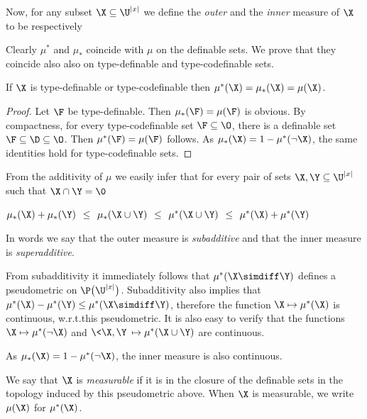 \documentclass[creche.tex]{subfiles}
\begin{document}
Now, for any subset $\X\subseteq\U^{|x|}$ we define the \emph{outer\/} and the \emph{inner\/} measure of $\X$ to be respectively



Clearly $\mu^*$ and $\mu_*$ coincide with $\mu$ on the definable sets.
We prove that they coincide also also on type-definable and type-codefinable sets.

\begin{proposition}
If $\X$ is type-definable or type-codefinable then $\mu^*(\X)=\mu_*(\X)=\mu(\X)$.
\end{proposition}
\begin{proof}
Let $\F$ be type-definable.
Then $\mu_*(\F)=\mu(\F)$ is obvious.
By compactness, for every type-codefinable set $\F\subseteq\O$, there is a definable set $\F\subseteq\D\subseteq\O$.
Then $\mu^*(\F)=\mu(\F)$ follows.
As $\mu_*(\X)=1-\mu^*(\neg\X)$, the same identities hold for type-codefinable sets.
\end{proof}

From the additivity of $\mu$ we easily infer that for every pair of sets $\X,\Y\subseteq\U^{|x|}$ such that $\X\cap\Y=\0$

\ssf{\#}\hfil$\mu_*(\X)+\mu_*(\Y)\medrel{\le}\mu_*(\X\cup\Y)\medrel{\le}\mu^*(\X\cup\Y)\medrel{\le}\mu^*(\X)+\mu^*(\Y)$

In words we say that the outer measure is \emph{subadditive\/} and that the inner measure is \emph{superadditive}.

From subadditivity it immediately follows that $\mu^*(\X\simdiff\Y)$ defines a pseudometric on $\P\big(\U^{|x|}\big)$.
Subadditivity also implies that $\mu^*(\X)-\mu^*(\Y)\le\mu^*(\X\simdiff\Y)$, therefore the function $\X\mapsto\mu^*(\X)$ is continuous, w.r.t.\@ this pseudometric.
It is also easy to verify that the functions $\X\mapsto\mu^*(\neg\X)$ and $\<\X,\Y\>\mapsto\mu^*(\X\cup\Y)$ are continuous.

As $\mu_*(\X)=1-\mu^*(\neg\X)$, the inner measure is also continuous.

We say that $\X$ is \emph{measurable\/} if it is in the closure of the definable sets in the topology induced by this pseudometric above. When $\X$ is measurable, we write \emph{$\mu(\X)$\/} for  $\mu^*(\X)$.
\end{document}
